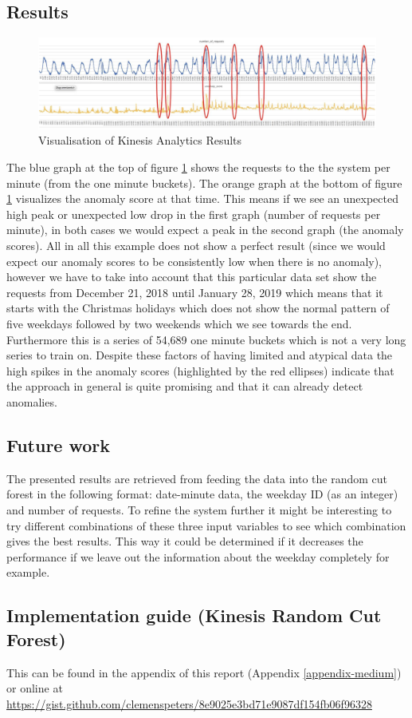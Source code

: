     \subsection{Results}
    \begin{figure}[h]
        \centering
        \includegraphics[width=1\textwidth]{images/kinesis-results.png}
        \caption{Visualisation of Kinesis Analytics Results}
        \label{fig:medium_kinesis_results}
    \end{figure}
    \FloatBarrier
    The blue graph at the top of figure \ref{fig:medium_kinesis_results} shows the requests to the the system per minute (from the one minute buckets). The orange graph at the bottom of figure \ref{fig:medium_kinesis_results} visualizes the anomaly score at that time. This means if we see an unexpected high peak or unexpected low drop in the first graph (number of requests per minute), in both cases we would expect a peak in the second graph (the anomaly scores). All in all this example does not show a perfect result (since we would expect our anomaly scores to be consistently low when there is no anomaly), however we have to take into account that this particular data set show the requests from December 21, 2018 until January 28, 2019 which means that it starts with the Christmas holidays which does not show the normal pattern of five weekdays followed by two weekends which we see towards the end.\\ Furthermore this is a series of 54,689 one minute buckets which is not a very long series to train on. Despite these factors of having limited and atypical data the high spikes in the anomaly scores (highlighted by the red ellipses) indicate that the approach in general is quite promising and that it can already detect anomalies.
    
    \subsection{Future work}
    The presented results are retrieved from feeding the data into the random cut forest in the following format: date-minute data, the weekday ID (as an integer) and number of requests.
    To refine the system further it might be interesting to try different combinations of these three input variables to see which combination gives the best results. This way it could be determined if it decreases the performance if we leave out the information about the weekday completely for example.
    
    \subsection{Implementation guide (Kinesis Random Cut Forest)} 
    This can be found in the appendix of this report (Appendix \ref{appendix-medium}) or online at \url{https://gist.github.com/clemenspeters/8e9025e3bd71e9087df154fb06f96328}